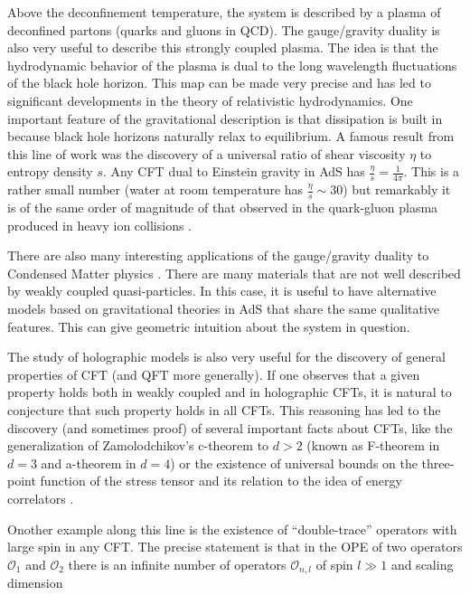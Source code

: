 \documentclass{ws-rv9x6}
\begin{document}
Above the deconfinement temperature, the system is described by a
plasma of deconfined partons (quarks and gluons in QCD). The gauge/gravity
duality is also very useful to describe this strongly coupled plasma.
The idea is that the hydrodynamic behavior of the plasma is dual to
the long wavelength fluctuations of the black hole horizon. This map
can be made very precise and has led to significant developments in
the theory of relativistic hydrodynamics. One important feature of
the gravitational description is that dissipation is built in because
black hole horizons naturally relax to equilibrium. A famous result
from this line of work was the discovery of a universal ratio of shear
viscosity $\eta$ to entropy density $s$. Any CFT dual to Einstein
gravity in AdS has $\frac{\eta}{s}=\frac{1}{4\pi}$. This is a rather
small number (water at room temperature has $\frac{\eta}{s}\sim30$)
but remarkably it is of the same order of magnitude of that observed
in the quark-gluon plasma produced in heavy ion collisions \cite{arXiv:0706.1522}.





There are also many interesting applications of the gauge/gravity
duality to Condensed Matter physics \cite{arXiv:0903.3246, arXiv:0909.0518}.
There are many materials that are not well described by weakly coupled quasi-particles. In this case, it is useful to have alternative models based on gravitational theories in AdS that  share the same qualitative features.
This can give geometric intuition about the system in question.


The study of holographic models is also very useful for the discovery
of general properties of CFT (and QFT more generally). If one observes
that a given property holds both in weakly coupled and in holographic
CFTs, it is natural to conjecture that such property holds in all
CFTs. This reasoning has led to the discovery (and sometimes proof)
of several important facts about CFTs, like the generalization of
Zamolodchikov's c-theorem to $d>2$ (known as F-theorem in $d=3$
and a-theorem in $d=4$) \cite{Zamolodchikov:1986gt, arXiv:1011.5819,  arXiv:1107.3987 , arXiv:1202.5650}
or the existence of universal bounds on the three-point function of
the stress tensor and its relation to the idea of energy correlators
\cite{arXiv:0803.1467, arXiv:1603.03771, arXiv:1605.08072}.

Onother example along this line is the existence of ``double-trace''
operators with large spin in any CFT. The precise statement is that
in the OPE of two operators $\mathcal{O}_{1}$ and $\mathcal{O}_{2}$
there is an infinite number of operators $\mathcal{O}_{n,l}$ of spin
$l\gg1$ and scaling dimension
\end{document}
